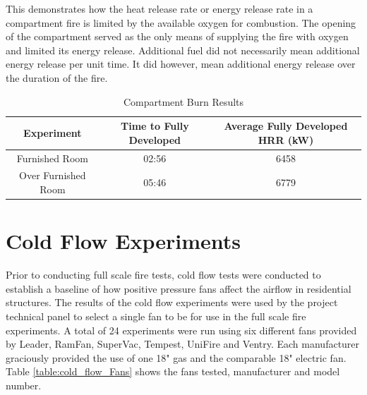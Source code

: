 \documentclass{article}
\begin{document}
This demonstrates how the heat release rate or energy release rate in a compartment fire is limited by the available oxygen for combustion. The opening of the compartment served as the only means of supplying the fire with oxygen and limited its energy release. Additional fuel did not necessarily mean additional energy release per unit time. It did however, mean additional energy release over the duration of the fire. 

\begin{table}[H]
	\caption{Compartment Burn Results}
	\begin{tabular}{|c|c|c|}
		\hline
		\textbf{Experiment} & \textbf{Time to Fully Developed} & \textbf{Average Fully Developed HRR (kW)} \\ \hline \hline
		Furnished Room & 02:56 & 6458 \\ \hline
		Over Furnished Room & 05:46 & 6779 \\ \hline
	\end{tabular}
	\label{table:comp_burn_results}
\end{table}

\clearpage

\section{Cold Flow Experiments}
Prior to conducting full scale fire tests, cold flow tests were conducted to establish a baseline of how positive pressure fans affect the airflow in residential structures. The results of the cold flow experiments were used by the project technical panel to select a single fan to be for use in the full scale fire experiments. A total of 24 experiments were run using six different fans provided by Leader, RamFan, SuperVac, Tempest, UniFire and Ventry. Each manufacturer graciously provided the use of one 18" gas and the comparable 18" electric fan. Table \ref{table:cold_flow_Fans} shows the fans tested, manufacturer and model number. 
\end{document}
